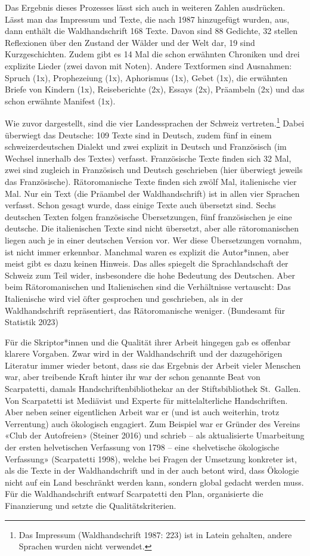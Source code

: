 \documentclass[a4paper,
fontsize=11pt,
oneside,
numbers=noperiodatend,
parskip=half-,
bibliography=totoc,
final
]{scrartcl}
\begin{document}
Das Ergebnis dieses Prozesses lässt sich auch in weiteren Zahlen
ausdrücken. Lässt man das Impressum und Texte, die nach 1987 hinzugefügt
wurden, aus, dann enthält die Waldhandschrift 168 Texte. Davon sind 88
Gedichte, 32 stellen Reflexionen über den Zustand der Wälder und der
Welt dar, 19 sind Kurzgeschichten. Zudem gibt es 14 Mal die schon
erwähnten Chroniken und drei explizite Lieder (zwei davon mit Noten).
Andere Textformen sind Ausnahmen: Spruch (1x), Prophezeiung (1x),
Aphorismus (1x), Gebet (1x), die erwähnten Briefe von Kindern (1x),
Reiseberichte (2x), Essays (2x), Präambeln (2x) und das schon erwähnte
Manifest (1x).

Wie zuvor dargestellt, sind die vier Landessprachen der Schweiz
vertreten.\footnote{Das Impressum (Waldhandschrift 1987: 223) ist in
  Latein gehalten, andere Sprachen wurden nicht verwendet.} Dabei
überwiegt das Deutsche: 109 Texte sind in Deutsch, zudem fünf in einem
schweizerdeutschen Dialekt und zwei explizit in Deutsch und Französisch
(im Wechsel innerhalb des Textes) verfasst. Französische Texte finden
sich 32 Mal, zwei sind zugleich in Französisch und Deutsch geschrieben
(hier überwiegt jeweils das Französische). Rätoromanische Texte finden
sich zwölf Mal, italienische vier Mal. Nur ein Text (die Präambel der
Waldhandschrift) ist in allen vier Sprachen verfasst. Schon gesagt
wurde, dass einige Texte auch übersetzt sind. Sechs deutschen Texten
folgen französische Übersetzungen, fünf französischen je eine deutsche.
Die italienischen Texte sind nicht übersetzt, aber alle rätoromanischen
liegen auch je in einer deutschen Version vor. Wer diese Übersetzungen
vornahm, ist nicht immer erkennbar. Manchmal waren es explizit die
Autor*innen, aber meist gibt es dazu keinen Hinweis. Das alles spiegelt
die Sprachlandschaft der Schweiz zum Teil wider, insbesondere die hohe
Bedeutung des Deutschen. Aber beim Rätoromanischen und Italienischen
sind die Verhältnisse vertauscht: Das Italienische wird viel öfter
gesprochen und geschrieben, als in der Waldhandschrift repräsentiert,
das Rätoromanische weniger. (Bundesamt für Statistik 2023)

Für die Skriptor*innen und die Qualität ihrer Arbeit hingegen gab es
offenbar klarere Vorgaben. Zwar wird in der Waldhandschrift und der
dazugehörigen Literatur immer wieder betont, dass sie das Ergebnis der
Arbeit vieler Menschen war, aber treibende Kraft hinter ihr war der
schon genannte Beat von Scarpatetti, damals Handschriftenbibliothekar an
der Stiftsbibliothek St.~Gallen. Von Scarpatetti ist Mediävist und
Experte für mittelalterliche Handschriften. Aber neben seiner
eigentlichen Arbeit war er (und ist auch weiterhin, trotz Verrentung)
auch ökologisch engagiert. Zum Beispiel war er Gründer des Vereins «Club
der Autofreien» (Steiner 2016) und schrieb -- als aktualisierte
Umarbeitung der ersten helvetischen Verfassung von 1798 -- eine
«helvetische ökologische Verfassung» (Scarpatetti 1998), welche bei
Fragen der Umsetzung konkreter ist, als die Texte in der Waldhandschrift
und in der auch betont wird, dass Ökologie nicht auf ein Land beschränkt
werden kann, sondern global gedacht werden muss. Für die Waldhandschrift
entwarf Scarpatetti den Plan, organisierte die Finanzierung und setzte
die Qualitätskriterien.
\end{document}
